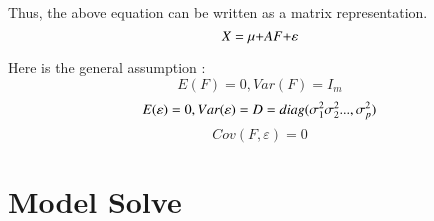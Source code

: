 \documentclass{mcmthesis}
\begin{document}
\begin{itemize}
    Thus, the above equation can be written as a matrix representation.
    \begin{equation}
    	X = \mu {\rm{ + }}AF{\rm{ + }}\varepsilon 
    \end{equation}
     
     Here is the general assumption : 
       \[E(F) = 0,Var(F) = {I_m}\]
     \[E(\varepsilon ) = 0,Var(\varepsilon ) = D = diag(\sigma _{\rm{1}}^{\rm{2}}\sigma _2^2...,\sigma _p^{\rm{2}})\]
    \[Cov(F,\varepsilon ) = 0\]
 
\end{itemize}
















 \section{Model Solve} %
\end{document}
